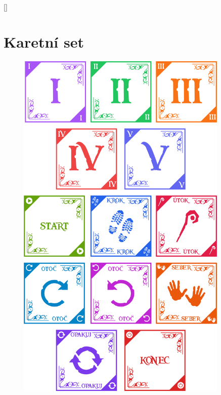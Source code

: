 \appendix

[\vspace{-22pt}]


\chapter{Karetní set}

\begin{figure}[hbtp]
	\centering
	\includegraphics[width=0.9\textwidth]{img/Cards.png}
	\label{fig:karetni_set}
\end{figure}